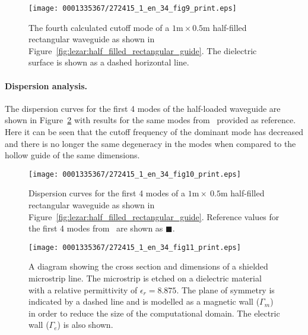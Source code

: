 \begin{figure}[!t]
\centering
\texttt{[image: 0001335367/272415\_1\_en\_34\_fig9\_print.eps]}
\caption{The fourth calculated cutoff mode of a
$1\text{m}\times0.5\text{m}$ half-filled rectangular waveguide as shown
in Figure~\ref{fig:lezar:half_filled_rectangular_guide}. The dielectric
surface is shown as a dashed horizontal line.}
\label{fig:lezar:half_filled_rectangular_cutoff_TM}\vspace*{-2pt}
\end{figure}

\paragraph{Dispersion analysis.}

The dispersion curves for the first 4
modes of the half-loaded waveguide are shown in
Figure~\ref{fig:lezar:half_loaded_rectangular_dispersion_curves}
with results for the same modes from~\citet{Jin2002} provided as
reference. Here it can be seen that the cutoff frequency of the dominant
mode has decreased and there is no longer the same degeneracy in the
modes when compared to the hollow guide of the same dimensions.


\begin{figure}[!t]
\centering
\texttt{[image: 0001335367/272415\_1\_en\_34\_fig10\_print.eps]}
\caption{Dispersion curves for the first 4 modes of a
$1\text{m}\times~0.5\text{m}$ half-filled rectangular waveguide as shown
in Figure~\ref{fig:lezar:half_filled_rectangular_guide}. Reference values
for the first 4 modes from~\citet{Jin2002} are shown as $\blacksquare$.}
\label{fig:lezar:half_loaded_rectangular_dispersion_curves}\vspace*{8pt}
\end{figure}

\begin{figure}[!t]
\centering
\texttt{[image: 0001335367/272415\_1\_en\_34\_fig11\_print.eps]}
\caption{A diagram showing the cross section and dimensions of a
shielded microstrip line. The microstrip is etched on a dielectric
material with a relative permittivity of $\epsilon_r = 8.875$. The
plane of symmetry is indicated by a dashed line and is modelled
as a magnetic wall ($\Gamma_m$) in order to reduce the size of the
computational domain. The electric wall ($\Gamma_e$) is also shown.}\label{fig:lezar:shielded_microstrip}\vspace*{-4pt}
\end{figure}

